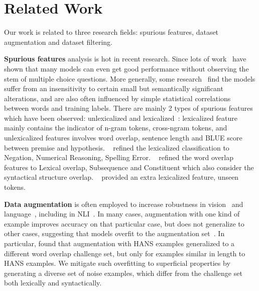 \section{Related Work}
\label{sec:related}

Our work is related to three research fields: spurious features, dataset augmentation and dataset filtering.
 
\textbf{Spurious features} analysis is hot in recent research. Since 
lots of work~\cite{sharma2018tackling,srinivasan2018simple,zellers2018swag} 
have shown that many models can even 
get good performance without observing the stem of  multiple choice questions.
More generally, some research~\cite{sanchez2018behavior} find the models suffer
from an insensitivity to certain small but semantically significant alterations, and are also
often influenced by simple statistical correlations between words and training labels. 
There are mainly 2 types of spurious features which have been observed: 
 unlexicalized and  lexicalized~\cite{bowman2015large}:
lexicalized feature mainly contains the indicator of n-gram tokens, cross-ngram tokens, 
and unlexicalized features involves word overlap, sentence length and BLUE score between 
premise and hypothesis. ~\cite{naik2018stress} refined the lexicalized classification to Negation, Numerical Reasoning, 
Spelling Error. ~\cite{mccoy2019right} refined the word overlap 
features to Lexical overlap, Subsequence and Constituent 
which also consider the syntactical structure overlap. ~\cite{sanchez2018behavior} 
provided an extra lexicalized feature, unseen tokens. 

\textbf{Data augmentation}
 is often employed to increase
robustness in vision~\cite{perez2017effectiveness} and
language~\cite{belinkov2017synthetic}, 
including in NLI~\cite{minervini2018adversarially,yanaka2019help}. 
In many cases, augmentation with one kind of example improves accuracy
on that particular case, but does not generalize to
other cases, suggesting that models overfit to the
augmentation set~\cite{jia2017adversarial,ribeiro2018semantically,iyyer2018adversarial,liu2019inoculation}. 
In particular, \cite{mccoy2019right} found that augmentation with HANS examples generalized to
a different word overlap challenge set, but only for examples similar in length
to HANS examples. We mitigate such overfitting to
superficial properties by generating a diverse set of
noise examples, which differ from the challenge set both lexically and syntactically. 

